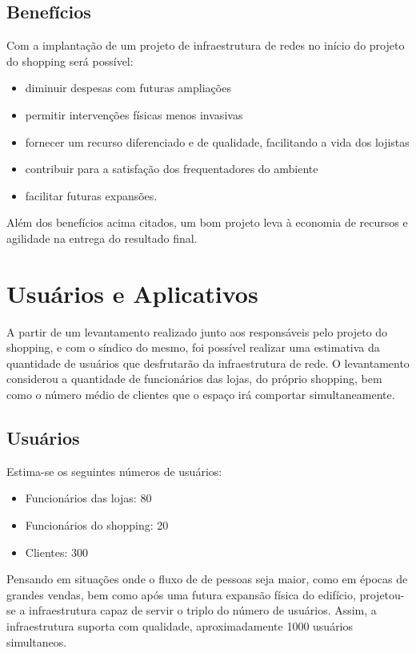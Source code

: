 \documentclass[	DIV=calc,%
							paper=a4,%
							fontsize=12pt,%
							onecolumn]{scrartcl}	 					%
\begin{document}
\subsection{Benefícios}
Com a implantação de um projeto de infraestrutura de redes no início do projeto do shopping será possível:
\begin{itemize}
	\item diminuir despesas com futuras ampliações
	\item permitir intervenções físicas menos invasivas 
	\item fornecer um recurso diferenciado e de qualidade, facilitando a vida dos lojistas
	\item contribuir para a satisfação dos frequentadores do ambiente
 	\item facilitar futuras expansões.
\end{itemize}
Além dos benefícios acima citados, um bom projeto leva à economia de recursos e agilidade na entrega do resultado final.

\section{Usuários e Aplicativos}
A partir de um levantamento realizado junto aos responsáveis pelo projeto do shopping, e com o síndico do mesmo, foi possível realizar uma estimativa da quantidade de usuários que desfrutarão da infraestrutura de rede.
O levantamento considerou a quantidade de funcionários das lojas, do próprio shopping, bem como o número médio de clientes que o espaço irá comportar simultaneamente.

\subsection{Usuários}
Estima-se os seguintes números de usuários:
\begin{itemize}
	\item Funcionários das lojas: 80
	\item Funcionários do shopping: 20
	\item Clientes: 300
\end{itemize}
Pensando em situações onde o fluxo de de pessoas seja maior, como em épocas de grandes vendas, bem como após uma futura expansão física do edifício, projetou-se a infraestrutura capaz de servir o triplo do número de usuários.
Assim, a infraestrutura suporta com qualidade, aproximadamente 1000 usuários simultaneos.
\end{document}
